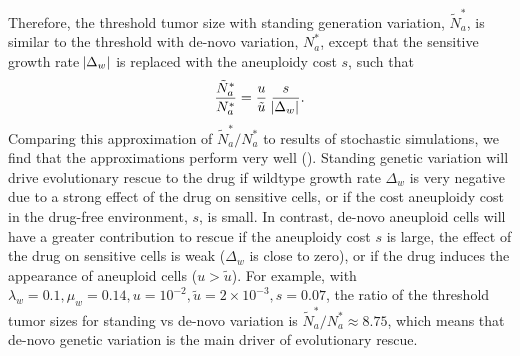 \documentclass[12pt]{extarticle}
\begin{document}
Therefore, the threshold tumor size with standing generation variation, $\tilde{N}^*_{a}$, is similar to the threshold with de-novo variation, $N^*_a$, except that the sensitive growth rate $\abs{\Delta_w}$ is replaced with the aneuploidy cost $s$, such that
\begin{equation}\label{eq:Nsgv}
\frac{\tilde{N}^*_{a}}{N^*_{a}} = \frac{u}{\tilde{u}} \; \frac{s}{\abs{\Delta_w}}.
\end{equation}
Comparing this approximation of $\tilde{N}^*_{a}/N^*_{a}$ to results of stochastic simulations, we find that the approximations perform very well (). 
Standing genetic variation will drive evolutionary rescue to the drug if wildtype growth rate $\Delta_w$ is very negative due to a strong effect of the drug on sensitive cells, or if the cost aneuploidy cost in the drug-free environment, $s$, is small.
In contrast, de-novo aneuploid cells will have a greater contribution to rescue if the aneuploidy cost $s$ is large, the effect of the drug on sensitive cells is weak ($\Delta_w$ is close to zero), or if the drug induces the appearance of aneuploid cells ($u > \tilde u$).
For example, with  $\lambda_w=0.1,\mu_w=0.14, u=10^{-2}, \tilde{u}=2\times10^{-3}, s=0.07$, the ratio of the threshold tumor sizes for standing vs de-novo variation is $\tilde{N}^*_a/N^*_a \approx 8.75$, which means that de-novo genetic variation is  the main driver of evolutionary rescue.
\end{document}
